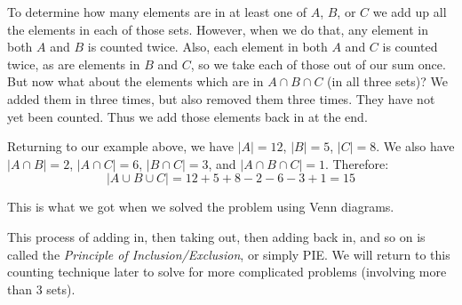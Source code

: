 \documentclass[10pt,]{book}
\theoremstyle{plain}
\theoremstyle{definition}
\theoremstyle{definition}
\theoremstyle{definition}
\numberwithin{equation}{section}
\newcommand{\card}[1]{\left| #1 \right|}
\begin{document}
      To determine how many elements are in at least one of \(A\), \(B\), or \(C\) we add up all the elements in each of those sets. However, when we do that, any element in both \(A\) and \(B\) is counted twice. Also, each element in both \(A\) and \(C\) is counted twice, as are elements in \(B\) and \(C\), so we take each of those out of our sum once. But now what about the elements which are in \(A \cap B \cap C\) (in all three sets)? We added them in three times, but also removed them three times. They have not yet been counted. Thus we add those elements back in at the end.
\par

      Returning to our example above, we have \(\card{A} = 12\), \(\card{B} = 5\), \(\card{C} = 8\). We also have \(\card{A \cap B} = 2\), \(\card{A \cap C} = 6\), \(\card{B \cap C} = 3\), and \(\card{A \cap B \cap C} = 1\). Therefore:
      \begin{equation*}
        \card{A \cup B \cup C} = 12 + 5 + 8 - 2 - 6 - 3 + 1 = 15
      \end{equation*}
\par

      This is what we got when we solved the problem using Venn diagrams.
\par

      This process of adding in, then taking out, then adding back in, and so on is called the \emph{Principle of Inclusion/Exclusion}, or simply PIE. We will return to this counting technique later to solve for more complicated problems (involving more than 3 sets).
\typeout{************************************************}
\typeout{************************************************}
\end{document}
